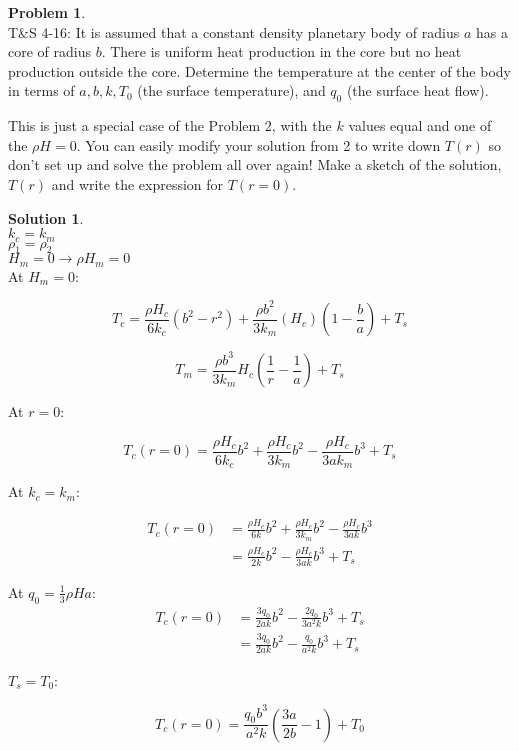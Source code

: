 \documentclass[titlepage, 11pt]{article}
\theoremstyle{definition}
\newtheorem{problem}{Problem}
\newtheorem*{solution}{Solution}
\begin{document}
\newpage

\begin{problem}\ \\
T\&S 4-16: It is assumed that a constant density planetary body of radius $a$ has a core of radius $b$. There is uniform heat production in the core but no heat production outside the core. Determine the temperature at the center of the body in terms of $a, b, k, T_0$ (the surface temperature), and $q_0$ (the surface heat flow).\vspace{\baselineskip}

\noindent
This is just a special case of the Problem 2, with the $k$ values equal and one of the $\rho H = 0$. You can easily modify your solution from 2 to write down $T(r)$ so don't set up and solve the problem all over again! Make a sketch of the solution, $T(r)$ and write the expression for $T(r=0)$.
\end{problem}

\begin{solution}\ \\

\noindent
$k_c = k_m$\\
$\rho_1 = \rho_2$\\
$H_m = 0 \to \rho H_m = 0$\\

At $H_m = 0$:

$$T_c = \frac{\rho H_c}{6k_c}\left( b^2 - r^2 \right) + \frac{\rho b^2}{3k_m}(H_c)(1-\frac{b}{a}) + T_s$$

$$T_m = \frac{\rho b^3}{3k_m}H_c \left( \frac{1}{r} - \frac{1}{a} \right) + T_s$$

At $r=0$:

$$T_c(r=0) = \frac{\rho H_c}{6k_c}b^2 +\frac{\rho H_c}{3k_m}b^2 - \frac{\rho H_c }{3ak_m}b^3 + T_s$$

At  $k_c = k_m$:

\begin{align*}
    T_c(r=0) & = \frac{\rho H_c}{6k}b^2 + \frac{\rho H_c}{3k_m}b^2 - \frac{\rho H_c}{3ak}b^3\\
    & = \frac{\rho H_c}{2k}b^2 - \frac{\rho H_c}{3ak}b^3 + T_s
\end{align*}

At $q_0 = \frac{1}{3}\rho H a$:
\begin{align*}
    T_c(r=0) & = \frac{3q_0}{2ak}b^2 - \frac{2q_0}{3 a^2 k}b^3 + T_s\\
    & = \frac{3q_0}{2ak}b^2 - \frac{q_0}{a^2k}b^3 + T_s
\end{align*}

$T_s = T_0$:

$$\boxed{T_c(r=0) = \frac{q_0 b^3}{a^2k}\left( \frac{3a}{2b} - 1 \right) + T_0}$$

\end{solution}
\end{document}
